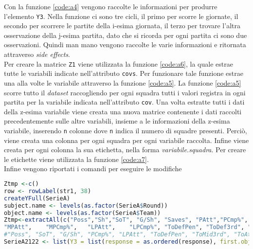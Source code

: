 Con la funzione \ref{code:a4} vengono raccolte le informazioni per produrre l'elemento \texttt{Y3}. Nella funzione ci sono tre cicli, il primo per scorre le giornate, il secondo per scorrere le partite della i-esima giornata, il terzo per trovare l'altra osservazione della j-esima partita, dato che si ricorda per ogni partita ci sono due osservazioni. Quindi man mano vengono raccolte le varie informazioni e ritornata attraverso \emph{side effects}.\\
Per creare la matrice \texttt{Z1} viene utilizzata la funzione \ref{code:a6}, la quale estrae tutte le variabili indicate nell'attributo \texttt{covs}. Per funzionare tale funzione estrae una alla volte le variabile attraverso la funzione \ref{code:a5}. La funzione \ref{code:a5} scorre tutto il \emph{dataset} raccogliendo per ogni squadra tutti i valori registra in ogni partita per la variabile indicata nell'attributo \texttt{cov}. Una volta estratte tutti i dati della z-esima variabile viene creata una nuova matrice contenente i dati raccolti precedentemente sulle altre variabili, insieme a le informazioni della z-esima variabile, inserendo \texttt{n} colonne dove \texttt{n} indica il numero di squadre presenti. Perciò, viene creata una colonna per ogni squadra per ogni variabile raccolta. Infine viene creata per ogni colonna la sua etichetta, nella forma \emph{variabile.squadra}. Per creare le etichette viene utilizzata la funzione \ref{code:a7}.\\

Infine vengono riportati i comandi per eseguire le modifiche
\begin{lstlisting}[language=R, caption={Comandi per la creazione della lista per il pacchetto \textit{BTLLAsso}}, captionpos=b, label=sec:a9]
Ztmp <-c()
row <- rowLabel(str1, 38)
createYFull(SerieA)
subject.name <- levels(as.factor(SerieA$Round))
object.name <- levels(as.factor(SerieA$Team))
Ztmp<-extractAll(c("Poss","Sh","SoT", "G/Sh", "Saves", "PAtt","PCmp%", "SPAtt",    "SPCmp%",  
"MPAtt",    "MPCmp%",   "LPAtt",    "LPCmp%", "ToDefPen", "ToDef3rd", "ToMid3rd", "ToAtt3rd", "ToAttPen", "TotDist", "Fls", "Fld", "Off", "Crs", "Int", "TklWin", "Recov"), row, object.name)
#"Poss", "SoT", "G/Sh", "PCmp%", "LPAtt", "ToDefPen", "ToMid3rd", "ToAttPen", "Fld", "TklWin"
SerieA2122 <- list(Y3 = list(response = as.ordered(response), first.object = as.double(first.object), second.object = as.double(second.object), subject = subject, withS = TRUE, subject.names = subject.name, object.names = object.name, n = 38, m = 20, k = 3, q = 2, with.order = with.order), Z1 = Ztmp)
\end{lstlisting}


